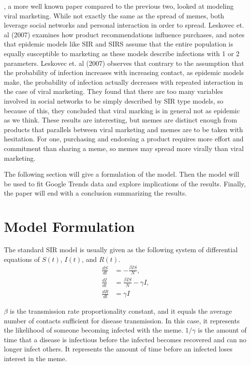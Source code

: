 \documentclass[12pt, letterpaper]{article}
\begin{document}
\cite{leskovec2007dynamics}, a more well known paper compared to the previous two, looked at modeling viral marketing. While not exactly the same as the spread of memes, both leverage social networks and personal interaction in order to spread. Leskovec et. al (2007) examines how product recommendations influence purchases, and notes that epidemic models like SIR and SIRS assume that the entire population is equally susceptible to marketing as these models describe infections with 1 or 2 parameters. Leskovec et. al (2007) observes that contrary to the assumption that the probability of infection increases with increasing contact, as epidemic models make, the probability of infection actually decreases with repeated interaction in the case of viral marketing. They found that there are too many variables involved in social networks to be simply described by SIR type models, so because of this, they concluded that viral marking is in general not as epidemic as we think. These results are interesting, but memes are distinct enough from products that parallels between viral marketing and memes are to be taken with hesitation. For one, purchasing and endorsing a product requires more effort and commitment than sharing a meme, so memes may spread more virally than viral marketing.

The following section will give a formulation of the model. Then the model will be used to fit Google Trends data and explore implications of the results. Finally, the paper will end with a conclusion summarizing the results.

\section*{Model Formulation}
The standard SIR model is usually given as the following system of differential equations of $S(t)$, $I(t)$, and $R(t)$.
\begin{equation}
\begin{aligned}
\frac{dS}{dt} &= -\frac{\beta IS}{N}, \\
\frac{dI}{dt} &= \frac{\beta IS}{N} - \gamma I, \\
\frac{dR}{dt} &= \gamma I
\end{aligned}
\label{eq: logical 1}
\end{equation}

$\beta$ is the transmission rate proportionality constant, and it equals the average number of contacts sufficient for disease transmission. In this case, it represents the likelihood of someone becoming infected with the meme. $1/\gamma$ is the amount of time that a disease is infectious before the infected becomes recovered and can no longer infect others. It represents the amount of time before an infected loses interest in the meme.
\end{document}
